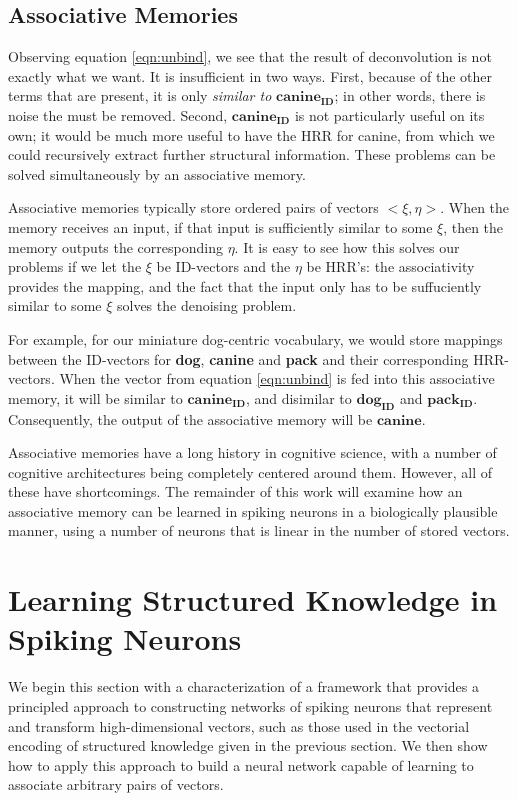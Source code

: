 \documentclass[10pt,letterpaper]{article}
\begin{document}
\subsection{Associative Memories}
Observing equation \eqref{eqn:unbind}, we see that the result of deconvolution is not exactly what we want. It is insufficient in two ways. First, because of the other terms that are present, it is only \textit{similar to} $\mathbf{canine_{ID}}$; in other words, there is noise the must be removed. Second, $\mathbf{canine_{ID}}$ is not particularly useful on its own; it would be much more useful to have the HRR for canine, from which we could recursively extract further structural information. These problems can be solved simultaneously by an associative memory.

Associative memories typically store ordered pairs of vectors $<\xi, \eta>$. When the memory receives an input, if that input is sufficiently similar to some $\xi$, then the memory outputs the corresponding $\eta$. It is easy to see how this solves our problems if we let the $\xi$ be ID-vectors and the $\eta$ be HRR's: the associativity provides the mapping, and the fact that the input only has to be suffuciently similar to some $\xi$ solves the denoising problem. 

For example, for our miniature dog-centric vocabulary, we would store mappings between the ID-vectors for \textbf{dog}, \textbf{canine} and \textbf{pack} and their corresponding HRR-vectors. When the vector from equation \eqref{eqn:unbind} is fed into this associative memory, it will be similar to $\mathbf{canine_{ID}}$, and disimilar to $\mathbf{dog_{ID}}$ and $\mathbf{pack_{ID}}$. Consequently, the output of the associative memory will be $\mathbf{canine}$. 

Associative memories have a long history in cognitive science, with a number of cognitive architectures being completely centered around them. However, all of these have shortcomings. The remainder of this work will examine how an associative memory can be learned in spiking neurons in a biologically plausible manner, using a number of neurons that is linear in the number of stored vectors.

\section{Learning Structured Knowledge in Spiking Neurons}
We begin this section with a characterization of a framework that provides a principled approach to constructing networks of spiking neurons that represent and transform high-dimensional vectors, such as those used in the vectorial encoding of structured knowledge given in the previous section. We then show how to apply this approach to build a neural network capable of learning to associate arbitrary pairs of vectors.
\end{document}
